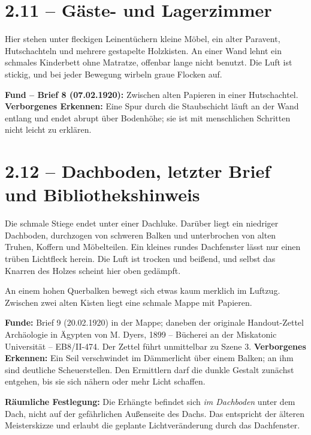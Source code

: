 \section{2.11 -- Gäste- und Lagerzimmer}
\begin{vorlesetextalle}
Hier stehen unter fleckigen Leinentüchern kleine Möbel, ein alter Paravent, Hutschachteln und mehrere gestapelte Holzkisten. An einer Wand lehnt ein schmales Kinderbett ohne Matratze, offenbar lange nicht benutzt. Die Luft ist stickig, und bei jeder Bewegung wirbeln graue Flocken auf.
\end{vorlesetextalle}
\begin{meisterinfo}
\textbf{Fund -- Brief 8 (07.02.1920):} Zwischen alten Papieren in einer Hutschachtel. \textbf{Verborgenes Erkennen:} Eine Spur durch die Staubschicht läuft an der Wand entlang und endet abrupt über Bodenhöhe; sie ist mit menschlichen Schritten nicht leicht zu erklären.
\end{meisterinfo}

\section{2.12 -- Dachboden, letzter Brief und Bibliothekshinweis}
\begin{vorlesetextalle}
Die schmale Stiege endet unter einer Dachluke. Darüber liegt ein niedriger Dachboden, durchzogen von schweren Balken und unterbrochen von alten Truhen, Koffern und Möbelteilen. Ein kleines rundes Dachfenster lässt nur einen trüben Lichtfleck herein. Die Luft ist trocken und bei\ss{}end, und selbst das Knarren des Holzes scheint hier oben gedämpft.

An einem hohen Querbalken bewegt sich etwas kaum merklich im Luftzug. Zwischen zwei alten Kisten liegt eine schmale Mappe mit Papieren.
\end{vorlesetextalle}
\begin{meisterinfo}
\textbf{Funde:} Brief 9 (20.02.1920) in der Mappe; daneben der originale Handout-Zettel \glqq{}Archäologie in Ägypten von M. Dyers, 1899 -- Bücherei an der Miskatonic Universität -- EB8/II-474\grqq{}. Der Zettel führt unmittelbar zu Szene 3. \textbf{Verborgenes Erkennen:} Ein Seil verschwindet im Dämmerlicht über einem Balken; an ihm sind deutliche Scheuerstellen. Den Ermittlern darf die dunkle Gestalt zunächst entgehen, bis sie sich nähern oder mehr Licht schaffen.

\textbf{Räumliche Festlegung:} Die Erhängte befindet sich \emph{im Dachboden} unter dem Dach, nicht auf der gefährlichen Au\ss{}enseite des Dachs. Das entspricht der älteren Meisterskizze und erlaubt die geplante Lichtveränderung durch das Dachfenster.\end{meisterinfo}

